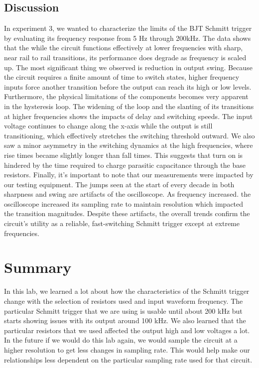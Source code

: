 \documentclass[9pt,a4paper,twoside]{tau-class/tau}
\begin{document}
	\subsection{Discussion}
	In experiment 3, we wanted to characterize the limits of the BJT Schmitt trigger by evaluating its frequency response from 5 Hz through 200kHz. The data shows that the while the circuit functions effectively at lower frequencies
	with sharp, near rail to rail transitions, its performance does degrade as frequency is scaled up. The most significant thing we observed is reduction in output swing. 
	Because the circuit requires a finite amount of time to switch states, higher frequency inputs force another transition before the output can reach
	its high or low levels. Furthermore, the physical limitations of the components becomes very apparent in the hysteresis loop. The widening of the loop and the slanting of
	its transitions at higher frequencies shows the impacts of delay and switching speeds. The input voltage continues to change along the x-axis while the output is still transitioning, which effectively stretches the switching threshold outward.
	We also saw a minor asymmetry in the switching dynamics at the high frequencies, where rise times became slightly longer than fall times. This suggests that turn on is hindered by the
	time required to charge parasitic capacitance through the base resistors. 
	Finally, it's important to note that our measurements were impacted by our testing equipment. The jumps seen at the start of every decade in both sharpness and swing
	are artifacts of the oscilloscope. As frequency increased. the oscilloscope increased its sampling rate to maintain resolution which impacted the transition magnitudes. Despite these artifacts, the
	overall trends confirm the circuit's utility as a reliable, fast-switching Schmitt trigger except at extreme frequencies.
	
\section{Summary} %
	In this lab, we learned a lot about how the characteristics of the Schmitt trigger change with the selection of resistors used and input waveform frequency. The particular Schmitt trigger that we are using is usable until about 200 kHz but starts showing issues with its output around 100 kHz. We also learned that the particular resistors that we used affected the output high and low voltages a lot.
	In the future if we would do this lab again, we would sample the circuit at a higher resolution to get less changes in sampling rate. This would help make our relationships less dependent on the particular sampling rate used for that circuit.
\end{document}
